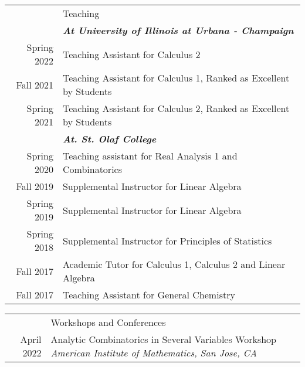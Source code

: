 \documentclass[letterpaper, 11pt]{article}
\newcommand{\headingfont}{\Large\color{Red}}
\newenvironment{SectionTable}[1]{
	\renewcommand*{\arraystretch}{1.7}
	\setlength{\tabcolsep}{10pt}
	\begin{longtable}{Rp{5.2in}} & #1 \\}
	{\end{longtable}\vspace{-.3cm}}
\begin{document}
	\begin{SectionTable}{\headingfont Teaching}
		& \textit{\textbf{At University of Illinois at Urbana - Champaign}}\\
		Spring 2022 & 
		Teaching Assistant for Calculus 2\\
		
		Fall 2021 & 
		Teaching Assistant for Calculus 1, Ranked as Excellent by Students\\
	
		Spring 2021 & 
		Teaching Assistant for Calculus 2, Ranked as Excellent by Students\\
		
		& \textit{\textbf{At. St. Olaf College}} \\
		Spring 2020 & 
		Teaching assistant for Real Analysis 1 and Combinatorics \\
		Fall 2019 & 
		Supplemental Instructor for Linear Algebra\\
		Spring 2019 & 
		Supplemental Instructor for Linear Algebra\\
		Spring 2018 & 
		Supplemental Instructor for Principles of Statistics\\
		Fall 2017 & 
		Academic Tutor for Calculus 1, Calculus 2 and Linear Algebra\\
		Fall 2017 & 
		Teaching Assistant for General Chemistry  \\
	
		

	\end{SectionTable}

	\begin{SectionTable}{\headingfont Workshops and Conferences}
		April 2022 &
		Analytic Combinatorics in Several Variables Workshop \newline
		\textit{American Institute of Mathematics, San Jose, CA} \\
		
	\end{SectionTable}
\end{document}
